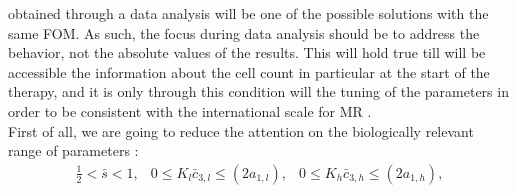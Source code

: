 \documentclass[a4paper,10pt]{article}
\begin{document}
obtained through a data analysis will be one of the possible
solutions with the same FOM.
As such, the focus during data analysis
should be to address the behavior, 
not the absolute values of the results.
This will hold true till will be accessible the information about
the cell count in particular at the start of the therapy,
and it is only through this condition will the tuning of the
parameters in order to be consistent with the international
scale for MR \cite{white2013establishment}.\\ 
First of all, we are going to reduce the attention 
on the biologically 
relevant range of parameters \cite{stiehl2012mathematical}:
\begin{equation}
\begin{array}{lll}
\frac{1}{2}<\bar{s}<1, & 0\leq K_{l}\bar{c}_{3,l}\leq (2a_{1,l}), & 0\leq K_{h}\bar{c}_{3,h}\leq (2a_{1,h}), \\ 
\end{array}
\end{equation}
\end{document}
